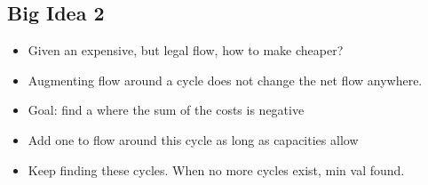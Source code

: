 \documentclass[12pt, letter]{article}
\begin{document}
\subsection*{Big Idea 2}
\begin{itemize}
	\item Given an expensive, but legal flow, how to make cheaper?
	\item Augmenting flow around a cycle does not change the net flow anywhere.
	\item Goal: find a where the sum of the costs is negative
	\item Add one to flow around this cycle as long as capacities allow
	\item Keep finding these cycles. When no more cycles exist, min val found.
\end{itemize}
\end{document}

